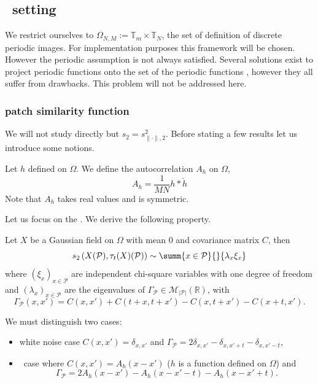 \subsection {\acontrario \ setting}
We restrict ourselves to $\Omega_{N,M} := \mathbb{T}_m \times \mathbb{T}_N$, the set of definition of discrete periodic images. For
implementation purposes this framework will be chosen. However the periodic
assumption is not always satisfied. Several solutions exist to project periodic
functions onto the set of the periodic functions \cite{moisan2011periodic}, however they all suffer
from drawbacks. This problem will not be addressed here.  \subsubsection{
  patch similarity function} We will not study  directly but
$s_2 = s_{\| \cdot \|, 2} ^2$. Before stating a few results let us introduce some
notions.
\begin{mydef}[Autocorrelation]
  Let $h$ defined on $\Omega$. We define the autocorrelation $A_h$ on $\Omega$,
  \[A_h = \frac{1}{MN} h * \check{h} \] Note that $A_h$ takes real values and is
  symmetric.
\end{mydef}
Let us focus on the \internalmatching . We derive the following property.
\begin{prop}
  Let $X$ be a Gaussian field on $\Omega$ with mean $0$ and covariance matrix
  $C$, then
  \[s_2\left(X(\mathcal{P}), \tau_t(X)(\mathcal{P})\right) \sim \summ{x \in
      \mathcal{P}}{}{\lambda_x \xi_x}\] where $(\xi_x)_{x \in \mathcal{P}}$ are
  independent chi-square variables with one degree of freedom and
  $(\lambda_x)_{x \in \mathcal{P}}$ are the eigenvalues of
  $\Gamma_{\mathcal{P}} \in \mathcal{M}_{\vert \mathcal{P} \vert}\left(
    \mathbb{R} \right)$, with
  \[ \Gamma_{\mathcal{P}}(x,x') = C(x, x') + C(t+x, t+x') - C(x,t+x') -
    C(x+t,x').
  \]
\end{prop}
We must distinguish two cases:
\begin{itemize}
\item white noise case $C(x,x') = \delta_{x,x'}$ and
  $\Gamma_{\mathcal{P}} = 2\delta_{x,x'} - \delta_{x,x'+t} - \delta_{x,x'-t}$,
\item \ADSN \ case where $C(x,x') = A_h(x-x')$ ($h$ is a function defined on
  $\Omega$) and
  \[\Gamma_{\mathcal{P}} = 2A_h(x-x') - A_h(x-x'-t) - A_h(x-x'+t) .\]
\end{itemize}
